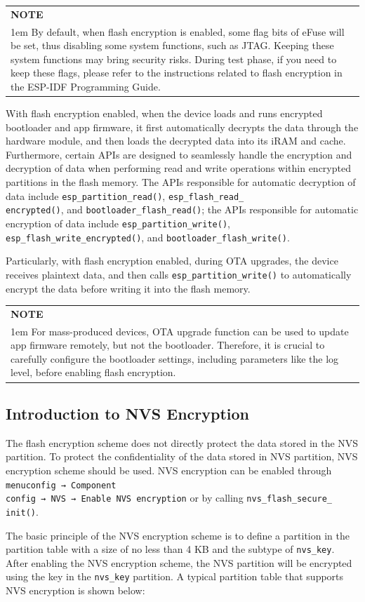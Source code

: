 \documentclass[a4paper,12pt,openany]{book}
\newcommand{\note}[2][NOTE]{ %
\vspace{6pt}
\begin{tabular}{b{\textwidth}}
\hline
\fontfamily{phv}\selectfont \textbf{#1}\\
\leftskip 1em #2\\
\hline
\end{tabular}
}
\begin{document}
\note{By default, when flash encryption is enabled, some flag bits of eFuse will be set, thus disabling some system functions, such as JTAG. Keeping these system functions may bring security risks. During test phase, if you need to keep these flags, please refer to the instructions related to flash encryption in the ESP-IDF Programming Guide.}

With flash encryption enabled, when the device loads and runs encrypted bootloader and app firmware, it first automatically decrypts the data through the hardware module, and then loads the decrypted data into its iRAM and cache. Furthermore, certain APIs are designed to seamlessly handle the encryption and decryption of data when performing read and write operations within encrypted partitions in the flash memory. The APIs responsible for automatic decryption of data include \verb|esp_partition_read()|, \verb|esp_flash_read_|\\ \verb|encrypted()|, and \verb|bootloader_flash_read()|; the APIs responsible for automatic encryption of data include \verb|esp_partition_write()|, \verb|esp_flash_write_encrypted()|, and \verb|bootloader_flash_write()|.

Particularly, with flash encryption enabled, during OTA upgrades, the device receives plaintext data, and then calls \verb|esp_partition_write()| to automatically encrypt the data before writing it into the flash memory.

\note{For mass-produced devices, OTA upgrade function can be used to update app firmware remotely, but not the bootloader. Therefore, it is crucial to carefully configure the bootloader settings, including parameters like the log level, before enabling flash encryption.}

\subsection{Introduction to NVS Encryption}
The flash encryption scheme does not directly protect the data stored in the NVS partition. To protect the confidentiality of the data stored in NVS partition, NVS encryption scheme should be used. NVS encryption can be enabled through \verb|menuconfig → Component |\\ \verb|config → NVS → Enable NVS encryption| or by calling \verb|nvs_flash_secure_|\\ \verb|init()|.

The basic principle of the NVS encryption scheme is to define a partition in the partition table with a size of no less than 4 KB and the subtype of \verb|nvs_key|. After enabling the NVS encryption scheme, the NVS partition will be encrypted using the key in the \verb|nvs_key| partition. A typical partition table that supports NVS encryption is shown below:
\end{document}
